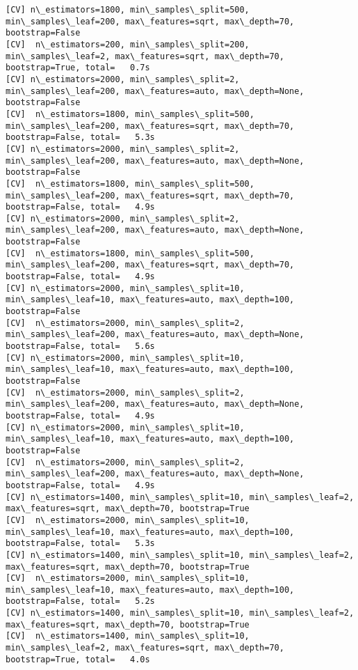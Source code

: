 \documentclass[11pt]{article}
\begin{document}
\begin{Verbatim}[commandchars=\\\{\}]
[CV] n\_estimators=1800, min\_samples\_split=500, min\_samples\_leaf=200, max\_features=sqrt, max\_depth=70, bootstrap=False 
[CV]  n\_estimators=200, min\_samples\_split=200, min\_samples\_leaf=2, max\_features=sqrt, max\_depth=70, bootstrap=True, total=   0.7s
[CV] n\_estimators=2000, min\_samples\_split=2, min\_samples\_leaf=200, max\_features=auto, max\_depth=None, bootstrap=False 
[CV]  n\_estimators=1800, min\_samples\_split=500, min\_samples\_leaf=200, max\_features=sqrt, max\_depth=70, bootstrap=False, total=   5.3s
[CV] n\_estimators=2000, min\_samples\_split=2, min\_samples\_leaf=200, max\_features=auto, max\_depth=None, bootstrap=False 
[CV]  n\_estimators=1800, min\_samples\_split=500, min\_samples\_leaf=200, max\_features=sqrt, max\_depth=70, bootstrap=False, total=   4.9s
[CV] n\_estimators=2000, min\_samples\_split=2, min\_samples\_leaf=200, max\_features=auto, max\_depth=None, bootstrap=False 
[CV]  n\_estimators=1800, min\_samples\_split=500, min\_samples\_leaf=200, max\_features=sqrt, max\_depth=70, bootstrap=False, total=   4.9s
[CV] n\_estimators=2000, min\_samples\_split=10, min\_samples\_leaf=10, max\_features=auto, max\_depth=100, bootstrap=False 
[CV]  n\_estimators=2000, min\_samples\_split=2, min\_samples\_leaf=200, max\_features=auto, max\_depth=None, bootstrap=False, total=   5.6s
[CV] n\_estimators=2000, min\_samples\_split=10, min\_samples\_leaf=10, max\_features=auto, max\_depth=100, bootstrap=False 
[CV]  n\_estimators=2000, min\_samples\_split=2, min\_samples\_leaf=200, max\_features=auto, max\_depth=None, bootstrap=False, total=   4.9s
[CV] n\_estimators=2000, min\_samples\_split=10, min\_samples\_leaf=10, max\_features=auto, max\_depth=100, bootstrap=False 
[CV]  n\_estimators=2000, min\_samples\_split=2, min\_samples\_leaf=200, max\_features=auto, max\_depth=None, bootstrap=False, total=   4.9s
[CV] n\_estimators=1400, min\_samples\_split=10, min\_samples\_leaf=2, max\_features=sqrt, max\_depth=70, bootstrap=True 
[CV]  n\_estimators=2000, min\_samples\_split=10, min\_samples\_leaf=10, max\_features=auto, max\_depth=100, bootstrap=False, total=   5.3s
[CV] n\_estimators=1400, min\_samples\_split=10, min\_samples\_leaf=2, max\_features=sqrt, max\_depth=70, bootstrap=True 
[CV]  n\_estimators=2000, min\_samples\_split=10, min\_samples\_leaf=10, max\_features=auto, max\_depth=100, bootstrap=False, total=   5.2s
[CV] n\_estimators=1400, min\_samples\_split=10, min\_samples\_leaf=2, max\_features=sqrt, max\_depth=70, bootstrap=True 
[CV]  n\_estimators=1400, min\_samples\_split=10, min\_samples\_leaf=2, max\_features=sqrt, max\_depth=70, bootstrap=True, total=   4.0s

\end{Verbatim}
\end{document}
